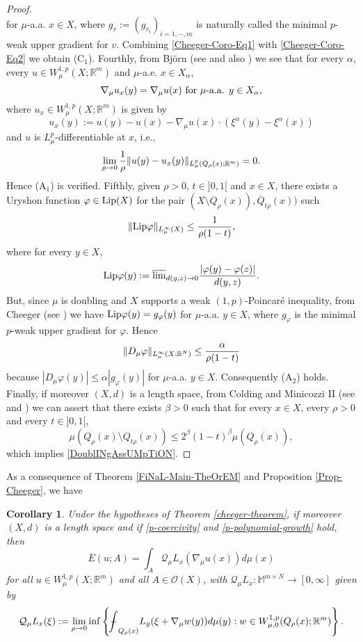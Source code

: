 \documentclass[10pt]{amsart}
\numberwithin{equation}{section}
\newtheorem{corollary}[theorem]{Corollary}
\theoremstyle{definition}
\theoremstyle{remark}
\begin{document}
\begin{proof}
\begin{equation}
\end{equation}
for $\mu$-a.a. $x\in X$, where $g_v:=(g_{v_i})_{i=1,\cdots,m}$ is naturally called the minimal $p$-weak upper gradient for $v$. Combining \eqref{Cheeger-Coro-Eq1} with \eqref{Cheeger-Coro-Eq2} we obtain (C$_1$). Fourthly,  from Bj{\"o}rn (see \cite[Theorem 4.5 and Corollary 4.6]{bjorn00} and also \cite[Theorem 2.12]{gong-haj-13}) we see that for every $\alpha$, every $u\in W^{1,p}_\mu(X;{{\mathbb R}}^m)$ and $\mu$-a.e. $x\in X_\alpha$,
$$
\nabla_\mu u_x(y)=\nabla_\mu u(x)\hbox{ for }\mu\hbox{-a.a. }y\in X_\alpha,
$$
where $u_x\in W^{1,p}_\mu(X;{{\mathbb R}}^m)$ is given by 
$$
u_x(y):=u(y)-u(x)-\nabla_\mu u(x)\cdot(\xi^\alpha(y)-\xi^\alpha(x))
$$
 and $u$ is $L^p_\mu$-differentiable at $x$, i.e.,
$$
\lim_{\rho\to 0}{1\over\rho}\|u(y)-u_x(y)\|_{L^p_\mu(Q_\rho(x);{{\mathbb R}}^m)}=0.
$$
Hence (A$_1$) is verified. Fifthly, given $\rho>0$, $t\in]0,1[$ and $x\in X$, there exists a Uryshon function $\varphi\in {\rm Lip}(X)$ for the pair $(X\setminus Q_\rho(x)), \overline{Q}_{t\rho}(x))$ such 
$$
\|{\rm Lip}\varphi\|_{L^\infty_\mu(X)}\leq{1\over\rho(1-t)},
$$
where for every $y\in X$,
$$
{\rm Lip}\varphi(y):={\mathop{\overline{\lim}}}_{d(y,z)\to0}{|\varphi(y)-\varphi(z)|\over d(y,z)}.
$$
But, since $\mu$ is doubling and $X$ supports a weak $(1,p)$-Poincar\'e inequality, from Cheeger (see \cite[Theorem 6.1]{cheeger99}) we have ${\rm Lip}\varphi(y)=g_\varphi(y)$ for $\mu$-a.a. $y\in X$, where $g_{\varphi}$ is the minimal $p$-weak upper gradient for $\varphi$. Hence 
$$
\|D_\mu\varphi\|_{L^\infty_\mu(X;{{\mathbb R}}^N)}\leq{\alpha\over\rho(1-t)}
$$ 
because $|D_\mu\varphi(y)|\leq\alpha|g_{\varphi}(y)|$ for $\mu$-a.a. $y\in X$. Consequently (A$_2$) holds. Finally, if moreover $(X,d)$ is a length space, from Colding and Minicozzi II (see \cite{colding-minicozzi98} and \cite[Proposition 6.12]{cheeger99}) we can assert that there exists $\beta>0$ such that for every $x\in X$, every $\rho>0$ and every $t\in]0,1[$, 
$$
\mu(Q_\rho(x)\setminus Q_{t\rho}(x))\leq 2^\beta(1-t)^\beta\mu(Q_\rho(x)),
$$
which implies \eqref{DoublINgAssUMpTiON}.
\end{proof}
 
\medskip 
 
As a consequence of Theorem \ref{FiNaL-Main-TheOrEM} and Proposition \ref{Prop-Cheeger}, we have 

\begin{corollary}\label{coro-Cheeger-2}
Under the hypotheses of Theorem {\rm\ref{cheeger-theorem}}, if moreover $(X,d)$ is a length space and if \eqref{p-coercivity} and \eqref{p-polynomial-growth} hold, then
$$
\overline{E}(u;A)=\int_A \mathcal{Q}_\mu L_x(\nabla_\mu u(x))d\mu(x) 
$$
for all $u\in W^{1,p}_\mu(X;{{\mathbb R}}^m)$ and all $A\in\mathcal{O}(X)$, with $\mathcal{Q}_\mu L_x:{{\mathbb M}^{m\times N}}\to[0,\infty]$ given by
$$
\mathcal{Q}_\mu L_x(\xi):=\lim_{\rho\to 0}\inf\left\{{{{\bf-}\!\!\!\!\!\!\hspace{-.1em}\int}}_{Q_\rho(x)}L_y(\xi+\nabla_\mu w(y))d\mu(y):w\in W^{1,p}_{\mu,0}(Q_\rho(x);{{\mathbb R}}^m)\right\}.
$$
\end{corollary} 
 
\end{document}
